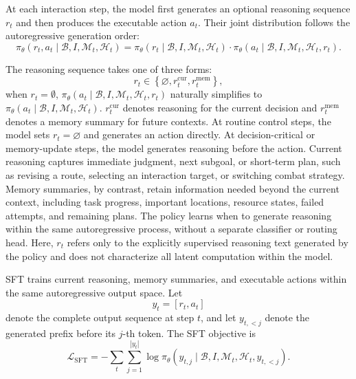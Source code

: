 At each interaction step, the model first generates an optional reasoning sequence $r_t$ and then produces the executable action $a_t$. Their joint distribution follows the autoregressive generation order:
\begin{equation}
\pi_\theta
\left(
r_t,a_t
\mid
\mathcal{B},I,\mathcal{M}_t,\mathcal{H}_t
\right)
=
\pi_\theta
\left(
r_t
\mid
\mathcal{B},I,\mathcal{M}_t,\mathcal{H}_t
\right)\cdot
\pi_\theta
\left(
a_t
\mid
\mathcal{B},I,\mathcal{M}_t,\mathcal{H}_t,r_t
\right).
\label{eq:sft_joint_policy}
\end{equation}

The reasoning sequence takes one of three forms:
\begin{equation}
r_t
\in
\left\{
\varnothing,
r_t^{\mathrm{cur}},
r_t^{\mathrm{mem}}
\right\},
\label{eq:reasoning_types}
\end{equation}
when $r_t = \emptyset$, $\pi_\theta(a_t \mid \mathcal{B}, I, \mathcal{M}_t, \mathcal{H}_t, r_t)$ naturally simplifies to $\pi_\theta(a_t \mid \mathcal{B}, I, \mathcal{M}_t, \mathcal{H}_t)$.
$r_t^{\mathrm{cur}}$ denotes reasoning for the current decision and $r_t^{\mathrm{mem}}$ denotes a memory summary for future contexts. At routine control steps, the model sets $r_t=\varnothing$ and generates an action directly. At decision-critical or memory-update steps, the model generates reasoning before the action. Current reasoning captures immediate judgment, next subgoal, or short-term plan, such as revising a route, selecting an interaction target, or switching combat strategy. Memory summaries, by contrast, retain information needed beyond the current context, including task progress, important locations, resource states, failed attempts, and remaining plans. The policy learns when to generate reasoning within the same autoregressive process, without a separate classifier or routing head. Here, $r_t$ refers only to the explicitly supervised reasoning text generated by the policy and does not characterize all latent computation within the model.

SFT trains current reasoning, memory summaries, and executable actions within the same autoregressive output space. Let
\[
y_t=[r_t,a_t]
\]
denote the complete output sequence at step $t$, and let $y_{t,<j}$ denote the generated prefix before its $j$-th token. The SFT objective is
\begin{equation}
\mathcal{L}_{\mathrm{SFT}}
=
-
\sum_t
\sum_{j=1}^{|y_t|}
\log
\pi_\theta
\left(
y_{t,j}
\mid
\mathcal{B},
I,
\mathcal{M}_t,
\mathcal{H}_t,
y_{t,<j}
\right).
\label{eq:sft_objective}
\end{equation}

